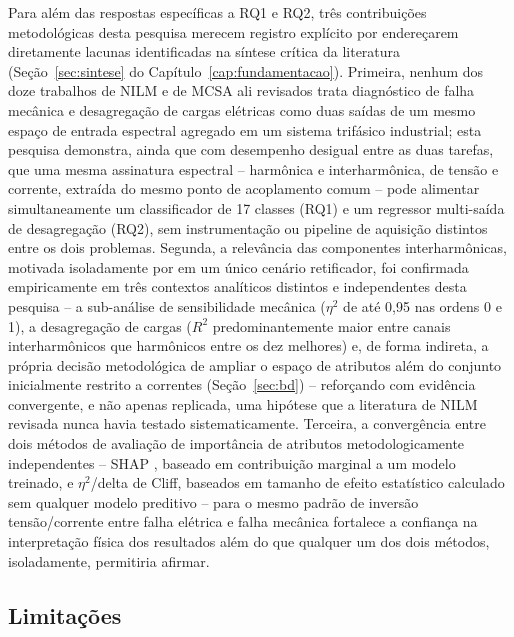 \documentclass[times,final]{elsarticle}
\begin{document}
Para além das respostas específicas a RQ1 e RQ2, três contribuições metodológicas desta pesquisa merecem registro explícito por endereçarem diretamente lacunas identificadas na síntese crítica da literatura (Seção~\ref{sec:sintese} do Capítulo~\ref{cap:fundamentacao}). Primeira, nenhum dos doze trabalhos de NILM e de MCSA ali revisados trata diagnóstico de falha mecânica e desagregação de cargas elétricas como duas saídas de um mesmo espaço de entrada espectral agregado em um sistema trifásico industrial; esta pesquisa demonstra, ainda que com desempenho desigual entre as duas tarefas, que uma mesma assinatura espectral -- harmônica e interharmônica, de tensão e corrente, extraída do mesmo ponto de acoplamento comum -- pode alimentar simultaneamente um classificador de 17 classes (RQ1) e um regressor multi-saída de desagregação (RQ2), sem instrumentação ou pipeline de aquisição distintos entre os dois problemas. Segunda, a relevância das componentes interharmônicas, motivada isoladamente por \citet{efe2016} em um único cenário retificador, foi confirmada empiricamente em três contextos analíticos distintos e independentes desta pesquisa -- a sub-análise de sensibilidade mecânica ($\eta^2$ de até 0,95 nas ordens 0 e 1), a desagregação de cargas ($R^2$ predominantemente maior entre canais interharmônicos que harmônicos entre os dez melhores) e, de forma indireta, a própria decisão metodológica de ampliar o espaço de atributos além do conjunto inicialmente restrito a correntes (Seção~\ref{sec:bd}) -- reforçando com evidência convergente, e não apenas replicada, uma hipótese que a literatura de NILM revisada nunca havia testado sistematicamente. Terceira, a convergência entre dois métodos de avaliação de importância de atributos metodologicamente independentes -- SHAP \citep{lundberg2017}, baseado em contribuição marginal a um modelo treinado, e $\eta^2$/delta de Cliff, baseados em tamanho de efeito estatístico calculado sem qualquer modelo preditivo -- para o mesmo padrão de inversão tensão/corrente entre falha elétrica e falha mecânica fortalece a confiança na interpretação física dos resultados além do que qualquer um dos dois métodos, isoladamente, permitiria afirmar.

\subsection{Limitações}
\label{cap:limitacoes}
\end{document}
